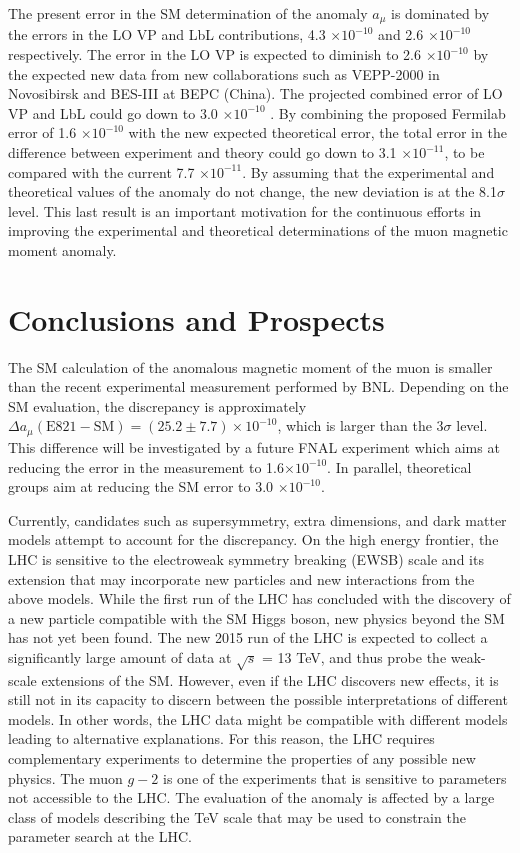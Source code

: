 \documentclass{outhesis}
\begin{document}
The present error in the SM determination of the anomaly $a_\mu$ is dominated by the errors in the LO VP and LbL contributions, 4.3 $\times 10^{-10}$ and 2.6 $\times 10^{-10}$ respectively. The error in the LO VP is expected to diminish to 2.6 $\times 10^{-10}$ by the expected new data from new collaborations such as VEPP-2000 in Novosibirsk and BES-III at BEPC (China). The projected combined error of LO VP and LbL could go down to 3.0 $\times 10^{-10}$ \cite{new_th}. By combining the proposed Fermilab error of 1.6 $\times 10^{-10}$ with the new expected theoretical error, the total error in the difference between experiment and theory could go down to 3.1 $\times 10^{-11}$, to be compared with the current 7.7 $\times 10^{-11}$. By assuming that the experimental and theoretical values of the anomaly do not change, the new deviation is at the 8.1$\sigma$ level. This last result is an important motivation for the continuous efforts in improving the experimental and theoretical determinations of the muon magnetic moment anomaly.  


\section{Conclusions and Prospects}
\label{fut}
The SM calculation of the anomalous magnetic moment of the muon is smaller than the recent experimental measurement performed by BNL. Depending on the SM evaluation, the discrepancy is approximately $\Delta a_{\mu} \left(\text{E821} - \text{SM}\right) = \left(25.2\pm7.7\right)\times 10^{-10}$, which is larger than the 3$\sigma$ level. This difference will be investigated by a future FNAL experiment which aims at reducing the error in the measurement to 1.6$ \times10^{-10}$. In parallel, theoretical groups aim at reducing the SM error to 3.0 $\times 10^{-10}$.

Currently, candidates such as supersymmetry, extra dimensions, and dark matter models attempt to account for the discrepancy. On the high energy frontier, the LHC is sensitive to the electroweak symmetry breaking (EWSB) scale and its extension that may incorporate new particles and new interactions from the above models. While the first run of the LHC has concluded with the discovery of a new particle compatible with the SM Higgs boson, new physics beyond the SM has not yet been found. The new 2015 run of the LHC is expected to collect a significantly large amount of data at $\sqrt{s}$ = 13 TeV, and thus probe the weak-scale extensions of the SM. However, even if the LHC discovers new effects, it is still not in its capacity to discern between the possible interpretations of different models. In other words, the LHC data might be compatible with different models leading to alternative explanations. For this reason, the LHC requires complementary experiments to determine the properties of any possible new physics. The muon $g-2$ is one of the experiments that is sensitive to parameters not accessible to the LHC. The evaluation of the anomaly is affected by a large class of models describing the TeV scale that may be used to constrain the parameter search at the LHC.
 
\end{document}
